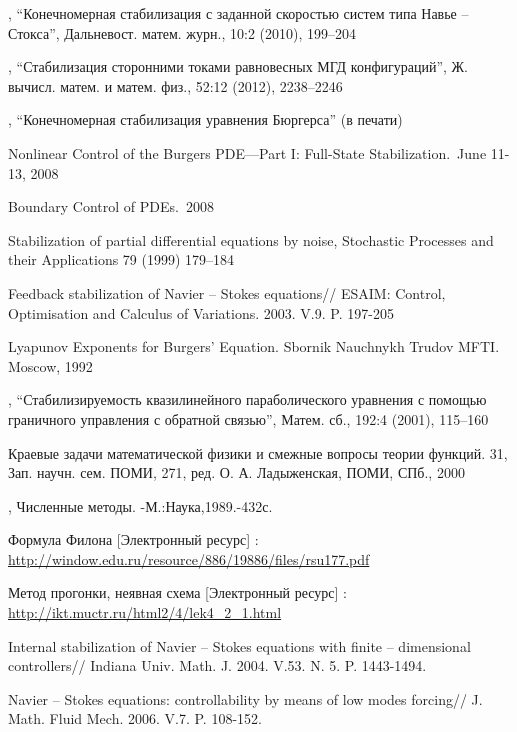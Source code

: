 \begin{thebibliography}{}
    , “Конечномерная
        стабилизация с заданной скоростью систем типа Навье – Стокса”,
        Дальневост. матем. журн., 10:2 (2010), 199–204 

    , “Стабилизация
        сторонними токами равновесных МГД конфигураций”, Ж. вычисл. матем. и
        матем. физ., 52:12 (2012), 2238–2246

    , “Конечномерная стабилизация
        уравнения Бюргерса” (в печати)

     Nonlinear 
        Control of the Burgers PDE—Part I: Full-State Stabilization.\ June 11-13, 2008

     Boundary Control of PDEs.\ 2008

     Stabilization of partial differential
        equations by noise, Stochastic Processes and their Applications 79
        (1999) 179–184

     Feedback stabilization of Navier – Stokes
        equations// ESAIM: Control, Optimisation and Calculus of Variations. 
        2003. V.9. P. 197-205

     Lyapunov Exponents for Burgers’ Equation. 
        Sbornik Nauchnykh Trudov MFTI. Moscow, 1992

    , “Стабилизируемость квазилинейного
            параболического уравнения с помощью граничного управления с обратной
            связью”, Матем. сб., 192:4 (2001), 115–160

    \bibitem{} Краевые задачи математической физики и смежные вопросы теории
        функций. 31, Зап. научн. сем. ПОМИ, 271, ред. О. А. Ладыженская, ПОМИ,
        СПб., 2000

    , Численные методы.
            -М.:Наука,1989.-432с.

     Формула Филона [Электронный ресурс] : 
        \url{http://window.edu.ru/resource/886/19886/files/rsu177.pdf}

     Метод прогонки, неявная схема [Электронный ресурс] : 
        \url{http://ikt.muctr.ru/html2/4/lek4_2_1.html}

     Internal stabilization of Navier – Stokes 
        equations with finite – dimensional controllers// Indiana Univ. 
        Math. J. 2004. V.53. N. 5. P. 1443-1494.

     Navier – Stokes equations: 
        controllability by means of low modes forcing// J. Math. Fluid Mech. 
        2006. V.7. P. 108-152.

\end{thebibliography}

